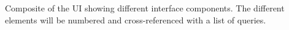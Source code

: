 \label{fig:ui}
Composite of the UI showing different interface components. The different elements will be numbered and cross-referenced with a list of queries.